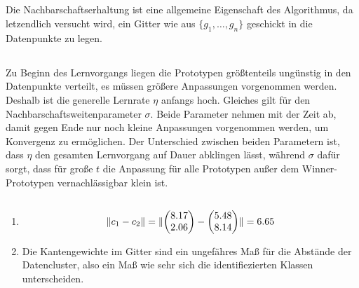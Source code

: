 \documentclass[DIN, pagenumber=false, fontsize=11pt, parskip=half]{scrartcl}
\DeclarePairedDelimiter\norm{\lVert}{\rVert}%
\begin{document}
    \subsection{}
    Die Nachbarschaftserhaltung ist eine allgemeine Eigenschaft des Algorithmus, da letzendlich versucht wird, ein Gitter wie aus $\{g_1, \ldots, g_n\}$ 
    geschickt in die Datenpunkte zu legen.

    \subsection{}
    Zu Beginn des Lernvorgangs liegen die Prototypen größtenteils ungünstig in den Datenpunkte verteilt, es müssen größere Anpassungen vorgenommen werden.
    Deshalb ist die generelle Lernrate $\eta$ anfangs hoch. Gleiches gilt für den Nachbarschaftsweitenparameter $\sigma$. Beide Parameter nehmen mit der
    Zeit ab, damit gegen Ende nur noch kleine Anpassungen vorgenommen werden, um Konvergenz zu ermöglichen. Der Unterschied zwischen beiden Parametern ist,
    dass $\eta$ den gesamten Lernvorgang auf Dauer abklingen lässt, während $\sigma$ dafür sorgt, dass für große $t$ die Anpassung für alle Prototypen
    außer dem Winner-Prototypen vernachlässigbar klein ist.

    \subsection{}
    \begin{enumerate}[label=\alph*)]
        \item  
            \begin{equation*}
                \norm{c_1 - c_2} = \norm{ \begin{pmatrix} 8.17 \\ 2.06\end{pmatrix} - \begin{pmatrix} 5.48 \\ 8.14\end{pmatrix}} = 6.65
            \end{equation*}
        \item Die Kantengewichte im Gitter sind ein ungefähres Ma\ss{} für die Abstände der Datencluster, also ein Ma\ss{} wie sehr sich die identifiezierten Klassen unterscheiden.
    \end{enumerate}
\end{document}
